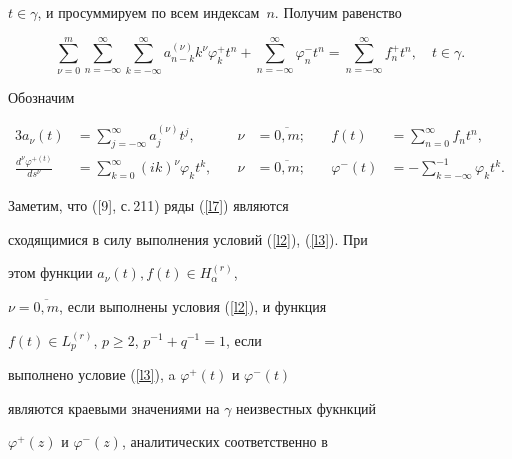 $t\in\gamma$, и просуммируем по всем индексам~$n$. Получим равенство


\begin{equation}


\label{l6}


\sum_{\nu=0}^m\sum_{n=-\infty}^{\infty}\sum_{k=-\infty}^{\infty}


a_{n-k}^{(\nu)}k^\nu\varphi_k^+t^n +


\sum_{n=-\infty}^{\infty}\varphi_n^-t^n=\sum_{n=-\infty}^{\infty}f_n^+t^n,


\quad t\in\gamma.


\end{equation}





Обозначим


\begin{alignat}{3}


\label{l7}


a_{\nu}(t)&=\sum_{j=-\infty}^{\infty}


a_j^{(\nu)}t^j,&\quad \nu&=\overline{0,m};&\quad 


f(t)&=\sum_{n=0}^\infty f_nt^n,\\


%


\label{l8}


\frac{d^\nu\varphi^{+(t)}}{ds^\nu}&=\sum_{k=0}^\infty (ik)^\nu \varphi_k t^k,


&\quad \nu&=\overline{0,m};&\quad \varphi^-(t)&=


-\sum_{k=-\infty}^{-1} \varphi_k t^k.


\end{alignat}


Заметим, что ([9], с.\,211) ряды (\ref{l7}) являются


сходящимися в силу выполнения условий (\ref{l2}), (\ref{l3}). При


этом функции $a_{\nu}(t),f(t) \in H_\alpha^{(r)}$,


$\nu=\overline{0, m}$, если выполнены условия (\ref{l2}), и функция


$f(t)\in L_p^{(r)}$, $p \geqslant 2$, $p^{-1}+q^{-1}=1$, если


выполнено условие (\ref{l3}), a $\varphi^+(t)$ и $\varphi^-(t)$


являются краевыми значениями на $\gamma$ неизвестных фукнкций


$\varphi^+(z)$ и $\varphi^-(z)$, аналитических соответственно в


